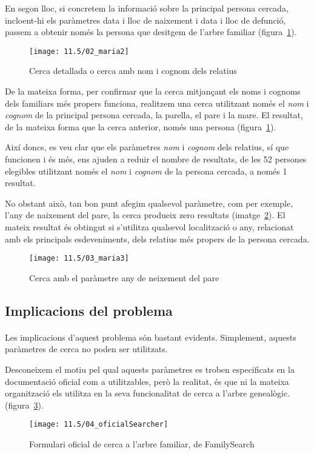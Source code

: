 En segon lloc, si concretem la informació sobre la principal persona cercada, incloent-hi els paràmetres data i lloc de naixement i data i lloc de defunció, passem a obtenir només la persona que desitgem de l'arbre familiar (figura~\ref{fig:maria2}).

\begin{figure}[h]
    \texttt{[image: 11.5/02\_maria2]}
    \centering
    \caption{Cerca detallada o cerca amb nom i cognom dels relatius}\label{fig:maria2}
\end{figure}

De la mateixa forma, per confirmar que la cerca mitjançant els noms i cognoms dels familiars més propers funciona, realitzem una cerca utilitzant només el \emph{nom} i \emph{cognom} de la principal persona cercada, la parella, el pare i la mare. El resultat, de la mateixa forma que la cerca anterior, només una persona (figura~\ref{fig:maria2}).

Així doncs, es veu clar que els paràmetres \emph{nom} i \emph{cognom} dels relatius, sí que funcionen i és més, ens ajuden a reduir el nombre de resultats, de les 52 persones elegibles utilitzant només el \emph{nom} i \emph{cognom} de la persona cercada, a només 1 resultat.

No obstant això, tan  bon punt afegim qualsevol paràmetre, com per exemple, l'any de naixement del pare, la cerca produeix zero resultats (imatge~\ref{fig:maria3}). El mateix resultat és obtingut si s'utilitza qualsevol localització o any, relacionat amb els principals esdeveniments, dels relatius més propers de la persona cercada.

\begin{figure}[h]
    \texttt{[image: 11.5/03\_maria3]}
    \centering
    \caption{Cerca amb el paràmetre any de neixement del pare}\label{fig:maria3}
\end{figure}


\subsection{Implicacions del problema}

\paragraph{}
Les implicacions d'aquest problema són bastant evidents. Simplement, aquests paràmetres de cerca no poden ser utilitzats.

Desconeixem el motiu pel qual aquests paràmetres es troben especificats en la documentació oficial com a utilitzables, però la realitat, és que ni la mateixa organit\-zació els utilitza en la seva funcionalitat de cerca a l'arbre genealògic. (figura~\ref{fig:searchofi}).

\begin{figure}[h]
    \texttt{[image: 11.5/04\_oficialSearcher]}
    \centering
    \caption{Formulari oficial de cerca a l'arbre familiar, de FamilySearch}\label{fig:searchofi}
\end{figure}
